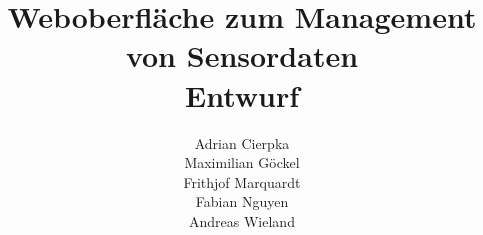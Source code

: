 \documentclass[a4paper, 12pt, titlepage]{article}
\begin{document}
\author{
	Adrian Cierpka \\
	Maximilian Göckel \\
	Frithjof Marquardt \\
	Fabian Nguyen \\
	Andreas Wieland
	\vspace{3cm}}
\title{Weboberfläche zum Management von Sensordaten\\\vspace{2cm}
	\Large Entwurf\\\vspace{3cm}}
	\posttitle{\end{center}}

\maketitle
{}
\tableofcontents
\clearpage
{} 


%

%






%

%
\end{document}
